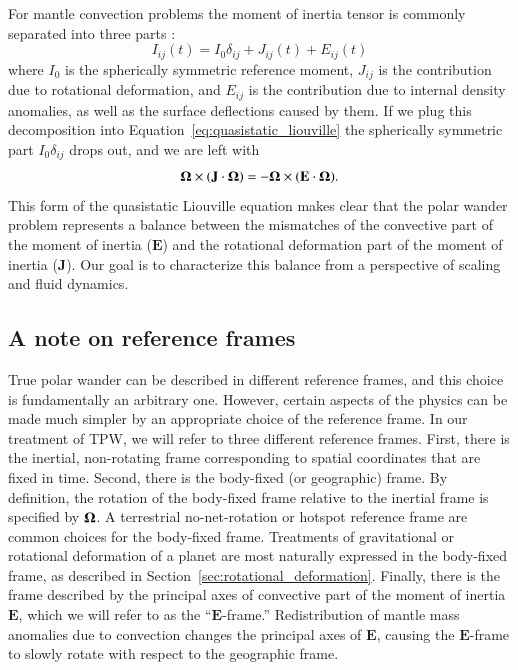 \documentclass[preprint,12pt,authoryear]{elsarticle}
\newcommand{\mitbf}[1]{\hbox{\mathversion{bold}$#1$}}
\begin{document}
For mantle convection problems the moment of inertia tensor is commonly separated into three parts \citep{sabadini1981pleistocene, spada1992excitation}:
\begin{equation}
I_{ij}(t) = I_0 \delta_{ij} + J_{ij}(t) + E_{ij}(t)
\label{eq:separation}
\end{equation}
where $I_0$ is the spherically symmetric reference moment, $J_{ij}$ is the contribution due to rotational deformation, and $E_{ij}$ is the contribution due to internal density anomalies, as well as the surface deflections caused by them.
If we plug this decomposition into Equation~\eqref{eq:quasistatic_liouville} the spherically symmetric part $I_0 \delta_{ij}$ drops out, and we are left with
\begin{equation}
\mathbf{\Omega} \times (\mathbf{J} \cdot \mitbf{\Omega}) = -\mitbf{\Omega} \times ( \mathbf{E} \cdot \mitbf{\Omega} ).
\label{eq:disequilibrium}
\end{equation}
This form of the quasistatic Liouville equation makes clear that the polar wander problem represents a balance between the mismatches
of the convective part of the moment of inertia ($\mathbf{E}$) and the rotational deformation part of the moment of inertia ($\mathbf{J}$).
Our goal is to characterize this balance from a perspective of scaling and fluid dynamics.

\subsection{A note on reference frames}
\label{sec:reference_frames}
True polar wander can be described in different reference frames, and this choice is fundamentally an arbitrary one.
However, certain aspects of the physics can be made much simpler by an appropriate choice of the reference frame.
In our treatment of TPW, we will refer to three different reference frames.  First, there is the inertial, non-rotating frame corresponding to spatial coordinates that are fixed in time.
 Second, there is the body-fixed (or geographic) frame.
By definition, the rotation of the body-fixed frame relative to the inertial frame is specified by $\mitbf{\Omega}$.
A terrestrial no-net-rotation or hotspot reference frame are common choices for the body-fixed frame.
Treatments of gravitational or rotational deformation of a planet are most naturally expressed in the body-fixed frame,
as described in Section~\ref{sec:rotational_deformation}.
 Finally, there is the frame described by the principal axes of convective part of the moment of inertia $\mathbf{E}$,
which we will refer to as the ``$\mathbf{E}$-frame.'' 
Redistribution of mantle mass anomalies due to convection changes the principal axes of $\mathbf{E}$, 
causing the $\mathbf{E}$-frame to slowly rotate with respect to the geographic frame. 
\end{document}
